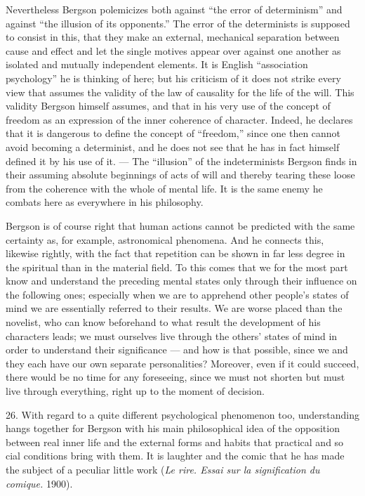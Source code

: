 \documentclass[12pt,a4paper,openany]{book}
\newcommand{\opage}[1]{\marginnote{\footnotesize\textit{[#1]}}}
\begin{document}
Nevertheless Bergson polemicizes both against ``the error of determinism'' and against ``the illusion of its opponents.'' The error of the determinists is supposed to consist in this, that they make an external,
\opage{46}mechanical separation between cause and effect and let the single motives appear over against one another as isolated and mutually independent elements. It is English ``association psychology'' he is thinking of here; but his criticism of it does not strike every view that assumes the validity of the law of causality for the life of the will. This validity Bergson himself assumes, and that in his very use of the concept of freedom as an expression of the inner coherence of character. Indeed, he declares that it is dangerous to define the concept of ``freedom,'' since one then cannot avoid becoming a determinist, and he does not see that he has in fact himself defined it by his use of it. --- The ``illusion'' of the indeterminists Bergson finds in their assuming absolute beginnings of acts of will and thereby tearing these loose from the coherence with the whole of mental life. It is the same enemy he combats here as everywhere in his philosophy.

Bergson is of course right that human actions cannot be predicted with the same certainty as, for example, astronomical phenomena. And he connects this, likewise rightly, with the fact that repetition can be shown in far less degree in the spiritual than in the material field. To this comes that we for the most part know and understand the preceding mental states only through their influence on the following ones; especially when we are to apprehend other people's states of mind we are essentially referred to their results. We are worse placed than the novelist, who can know beforehand to what result the development of his characters leads; we must ourselves live through the others' states of mind in order to understand their significance --- and how is that possible, since we and they each have our own separate personalities? Moreover, even if it could succeed, there would be no time for any foreseeing, since we must not shorten but must live through everything, right up to the moment of decision.

26. With regard to a quite different psychological phenomenon too, understanding hangs together for Bergson with his main philosophical idea of the opposition between real inner life and the external forms and habits that practical and so%
\opage{47}cial conditions bring with them. It is laughter and the comic that he has made the subject of a peculiar little work (\textit{Le rire. Essai sur la signification du comique.} 1900).
\end{document}
